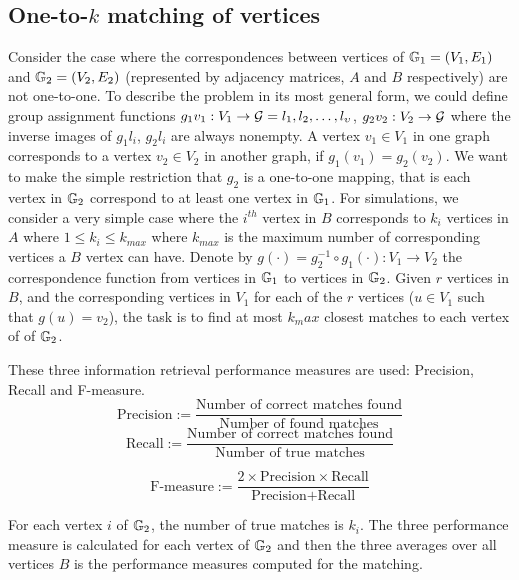 \documentclass[12pt,oneside,final]{thesis}\usepackage[]{graphicx}\usepackage[]{color}
\begin{document}
\subsection{One-to-$k$ matching of vertices} 

Consider the case where the correspondences between vertices of $\mathbb{G}_1=(V_1,E_1)$ and $\mathbb{G}_2= (V_2,E_2)$ (represented by adjacency matrices, $A$ and $B$ respectively) are not one-to-one. To describe the problem in its most general form, we could define group assignment functions $g_1{v_1}: V_1 \rightarrow \mathcal{G}={l_1,l_2,\ldots,l_{\upsilon}}$, $g_2{v_2}:V_2 \rightarrow \mathcal{G}$ where the inverse images of $g_1{l_i}$, $g_2{l_i}$ are always nonempty. A vertex $v_1 \in  V_1$ in one graph corresponds to a vertex $v_2 \in  V_2$  in another graph, if $g_1(v_1)=g_2(v_2)$. We want to make the simple restriction that $g_2$ is a one-to-one mapping, that is each vertex in $\mathbb{G}_2$ correspond to at least one vertex in  $\mathbb{G}_1$.
For simulations, we consider a very simple case where the $i^{th}$ vertex in $B$ corresponds to $k_i$ vertices in $A$ where $1\leq k_i \leq k_{max}$ where $k_{max}$ is the maximum number of corresponding vertices a $B$ vertex can have.  Denote by $g(\cdot)=g_2^{-1}\circ g_1(\cdot) : V_1 \rightarrow V_2$ the correspondence function from vertices in $\mathbb{G}_1$ to vertices in $\mathbb{G}_2$. Given $r$ vertices in $B$, and the corresponding vertices in $V_1$ for each of the $r$ vertices ($u \in V_1$ such that $g(u)=v_2$), the task is  to find at most $k_max$ closest matches to each vertex of of $\mathbb{G}_2$. 

These three information retrieval performance measures are used: Precision, Recall and F-measure.
$$\textrm{Precision} :=\frac{\textrm{Number of correct matches found}}{\textrm{Number of found matches}}$$
$$\textrm{Recall}    :=\frac{\textrm{Number of correct matches found}}{\textrm{Number of true matches}}$$

$$\textrm{F-measure}  :=\frac{2 \times \textrm{Precision} \times \textrm{Recall}}{\textrm{Precision} + \textrm{Recall}}$$

For each vertex $i$ of $\mathbb{G}_2$, the number of true matches is $k_i$. The three performance measure is calculated for each vertex of $\mathbb{G}_2$ and then the three averages over all vertices $B$ is the performance measures computed for the  matching.
\end{document}
